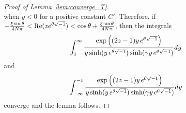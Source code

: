 \begin{proof}[Proof of Lemma~\ref{lem:converge_T}]
\begin{equation*}
\end{equation*}
when $y<0$ for a positive constant $C'$.
Therefore, if $-\frac{\xi\sin\theta}{4N\pi}<\operatorname{Re}(ze^{\theta\sqrt{-1}})<\cos\theta+\frac{\xi\sin\theta}{4N\pi}$, then the integrals
\begin{equation*}
  \int_{1}^{\infty}
  \frac{\exp\left((2z-1)y\,e^{\theta\sqrt{-1}}\right)}
       {y\sinh(y\,e^{\theta\sqrt{-1}})\sinh(\gamma y\,e^{\theta\sqrt{-1}})}
  dy
\end{equation*}
and
\begin{equation*}
  \int_{-\infty}^{-1}
  \frac{\exp\left((2z-1)y\,e^{\theta\sqrt{-1}}\right)}
       {y\sinh(y\,e^{\theta\sqrt{-1}})\sinh(\gamma y\,e^{\theta\sqrt{-1}})}
  dy
\end{equation*}
converge and the lemma follows.
\end{proof}
